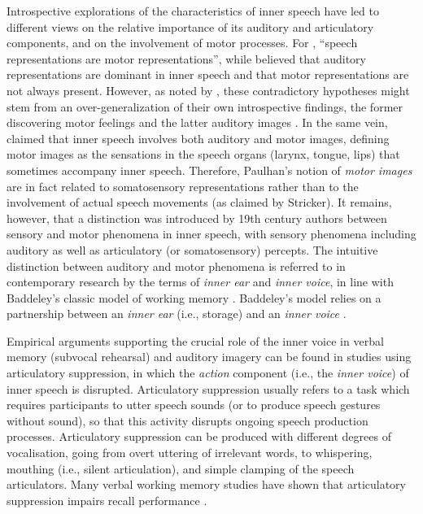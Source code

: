 \documentclass[12pt,]{book}
\begin{document}
Introspective explorations of the characteristics of inner speech have
led to different views on the relative importance of its auditory and
articulatory components, and on the involvement of motor processes. For
\citet{Stricker1880}, ``speech representations are motor
representations'', while \citet{Egger1881} believed that auditory
representations are dominant in inner speech and that motor
representations are not always present. However, as noted by
\citet{Ballet1886}, these contradictory hypotheses might stem from an
over-generalization of their own introspective findings, the former
discovering motor feelings and the latter auditory images
\citep{Ballet1886}. In the same vein, \citet{Paulhan1886} claimed that
inner speech involves both auditory and motor images, defining motor
images as the sensations in the speech organs (larynx, tongue, lips)
that sometimes accompany inner speech. Therefore, Paulhan's notion of
\emph{motor images} are in fact related to somatosensory representations
rather than to the involvement of actual speech movements (as claimed by
Stricker). It remains, however, that a distinction was introduced by
19th century authors between sensory and motor phenomena in inner
speech, with sensory phenomena including auditory as well as
articulatory (or somatosensory) percepts. The intuitive distinction
between auditory and motor phenomena is referred to in contemporary
research by the terms of \emph{inner ear} and \emph{inner voice}, in
line with Baddeley's classic model of working memory
\citetext{\citealp[e.g.,][]{Baddeley1974}; \citealp[see
also][]{Buchsbaum2013}}. Baddeley's model relies on a partnership
between an \emph{inner ear} (i.e., storage) and an \emph{inner voice}
\citep[i.e., subvocal rehearsal; see][]{Smith1995}.

Empirical arguments supporting the crucial role of the inner voice in
verbal memory (subvocal rehearsal) and auditory imagery can be found in
studies using articulatory suppression, in which the \emph{action}
component (i.e., the \emph{inner voice}) of inner speech is disrupted.
Articulatory suppression usually refers to a task which requires
participants to utter speech sounds (or to produce speech gestures
without sound), so that this activity disrupts ongoing speech production
processes. Articulatory suppression can be produced with different
degrees of vocalisation, going from overt uttering of irrelevant words,
to whispering, mouthing (i.e., silent articulation), and simple clamping
of the speech articulators. Many verbal working memory studies have
shown that articulatory suppression impairs recall performance
\citep[e.g.,][]{Baddeley1984}.
\end{document}
